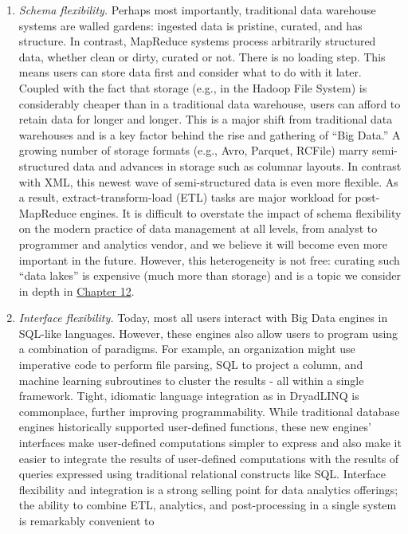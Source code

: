 \documentclass[b5paper,11pt,twoside,openright]{book}
\begin{document}
\begin{enumerate}[label=\arabic*.)]
\item
\emph{Schema flexibility.} Perhaps most importantly, traditional
data warehouse systems are walled gardens: ingested data is pristine,
curated, and has structure. In contrast, MapReduce systems process
arbitrarily structured data, whether clean or dirty, curated or not.
There is no loading step. This means users can store data first and
consider what to do with it later. Coupled with the fact that storage
(e.g., in the Hadoop File System) is considerably cheaper than in a
traditional data warehouse, users can afford to retain data for longer
and longer. This is a major shift from traditional data warehouses and
is a key factor behind the rise and gathering of ``Big Data.'' A growing
number of storage formats (e.g., Avro, Parquet, RCFile) marry
semi-structured data and advances in storage such as columnar layouts.
In contrast with XML, this newest wave of semi-structured data is even
more flexible. As a result, extract-transform-load (ETL) tasks are major
workload for post-MapReduce engines. It is difficult to overstate the
impact of schema flexibility on the modern practice of data management
at all levels, from analyst to programmer and analytics vendor, and we
believe it will become even more important in the future. However, this
heterogeneity is not free: curating such ``data lakes'' is expensive
(much more than storage) and is a topic we consider in depth in
\hyperref[ch12-dataintegration]{Chapter 12}.
\item
\emph{Interface flexibility.} Today, most all users interact with
Big Data engines in SQL-like languages. However, these engines also
allow users to program using a combination of paradigms. For example, an
organization might use imperative code to perform file parsing, SQL to
project a column, and machine learning subroutines to cluster the
results - all within a single framework. Tight, idiomatic language
integration as in DryadLINQ is commonplace, further improving
programmability. While traditional database engines historically
supported user-defined functions, these new engines' interfaces make
user-defined computations simpler to express and also make it easier to
integrate the results of user-defined computations with the results of
queries expressed using traditional relational constructs like SQL.
Interface flexibility and integration is a strong selling point for data
analytics offerings; the ability to combine ETL, analytics, and
post-processing in a single system is remarkably convenient to

\end{enumerate}
\end{document}
